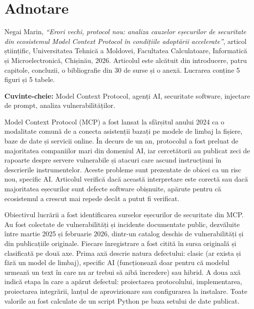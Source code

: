 \chapter*{Adnotare}

\par Negai Marin, \textit{``Erori vechi, protocol nou: analiza cauzelor eșecurilor de securitate din ecosistemul Model Context Protocol în condițiile adoptării accelerate''}, articol științific, Universitatea Tehnică a Moldovei, Facultatea Calculatoare, Informatică și Microelectronică, Chișinău, 2026. Articolul este alcătuit din introducere, patru capitole, concluzii, o bibliografie din 30 de surse și o anexă. Lucrarea conține 5 figuri și 5 tabele.

\vspace{0.3cm}
\par \noindent \textbf{Cuvinte-cheie:} Model Context Protocol, agenți AI, securitate software, injectare de prompt, analiza vulnerabilităților.
\vspace{0.3cm}

\par Model Context Protocol (MCP) a fost lansat la sfârșitul anului 2024 ca o modalitate comună de a conecta asistenții bazați pe modele de limbaj la fișiere, baze de date și servicii online. În decurs de un an, protocolul a fost preluat de majoritatea companiilor mari din domeniul AI, iar cercetătorii au publicat zeci de rapoarte despre servere vulnerabile și atacuri care ascund instrucțiuni în descrierile instrumentelor. Aceste probleme sunt prezentate de obicei ca un risc nou, specific AI. Articolul verifică dacă această interpretare este corectă sau dacă majoritatea eșecurilor sunt defecte software obișnuite, apărute pentru că ecosistemul a crescut mai repede decât a putut fi verificat.

\par Obiectivul lucrării a fost identificarea surselor eșecurilor de securitate din MCP. Au fost colectate \nRecords{} de vulnerabilități și incidente documentate public, dezvăluite între martie 2025 și februarie 2026, dintr-un catalog deschis de vulnerabilități și din publicațiile originale. Fiecare înregistrare a fost citită în sursa originală și clasificată pe două axe. Prima axă descrie natura defectului: clasic (ar exista și fără un model de limbaj), specific AI (funcționează doar pentru că modelul urmează un text în care nu ar trebui să aibă încredere) sau hibrid. A doua axă indică etapa în care a apărut defectul: proiectarea protocolului, implementarea, proiectarea integrării, lanțul de aprovizionare sau configurarea la instalare. Toate valorile au fost calculate de un script Python pe baza setului de date publicat.

